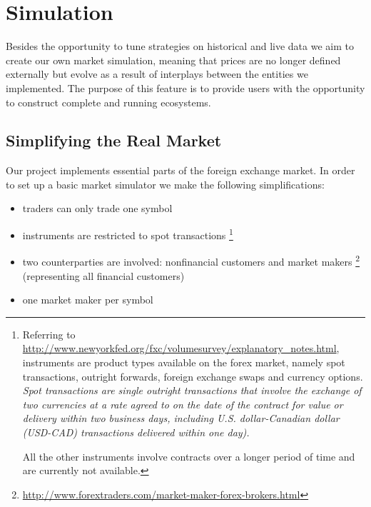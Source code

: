 
\section{Simulation}
Besides the opportunity to tune strategies on historical and live data we aim to
create our own market simulation, meaning that prices are no longer defined
externally but evolve as a result of interplays between the entities we implemented.
The purpose of this feature is to provide users with the opportunity to construct
complete and running ecosystems.

\subsection{Simplifying the Real Market}
Our project implements essential parts of the foreign exchange market.
In order to set up a basic market simulator we make the following
simplifications:

\begin{itemize}
    \item traders can only trade one symbol
    \item instruments are restricted to spot transactions
        \footnote{Referring to \url{http://www.newyorkfed.org/fxc/volumesurvey/explanatory_notes.html},
        instruments
        are product types available on the forex market, namely spot transactions, outright
        forwards, foreign exchange swaps and currency options. \textit{Spot transactions are single
        outright transactions that involve the exchange of two currencies at a rate agreed
        to on the date of the contract for value or delivery within two business days, including
        U.S. dollar-Canadian dollar (USD-CAD) transactions delivered within one day).}

        All the other instruments involve contracts over a longer period of time and are
        currently not available.}


    \item two counterparties are involved: nonfinancial customers and market makers
        \footnote{\url{http://www.forextraders.com/market-maker-forex-brokers.html}}
        (representing all financial customers)
    \item one market maker per symbol
\end{itemize}

